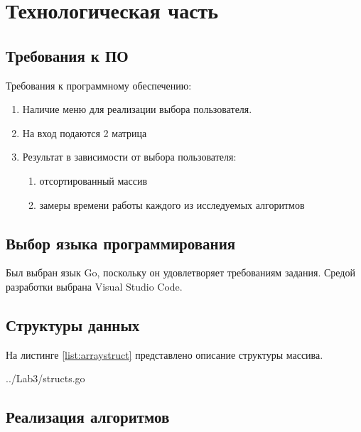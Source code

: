 
\chapter{Технологическая часть}\label{tecnology}

\section{Требования к ПО}\label{Requirements}

Требования к программному обеспечению:
\begin{enumerate}
    \item Наличие меню для реализации выбора пользователя.
    \item На вход подаются 2 матрица
    \item Результат в зависимости от выбора пользователя:
    \begin{enumerate}
        \item отсортированный массив
        \item замеры времени работы каждого из исследуемых алгоритмов
    \end{enumerate}
\end{enumerate}

\section{Выбор языка программирования}\label{Requirements}

Был выбран язык Go, поскольку он удовлетворяет требованиям задания. Средой разработки выбрана Visual Studio Code.

\section{Структуры данных}\label{StructsList}

На листинге \ref{list:arraystruct} представлено описание структуры массива.

\begin{lstinputlisting}
    [caption = {Структура массива},
    label = {list:arraystruct},
    linerange={7-10},
    ]{../Lab3/structs.go}
\end{lstinputlisting}

\section{Реализация алгоритмов}\label{Listings}

